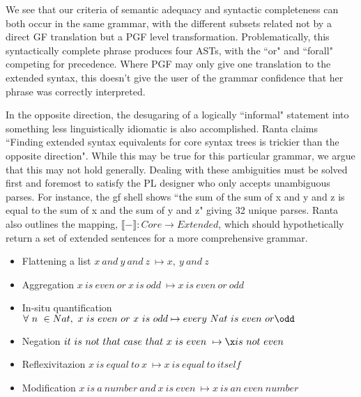 
We see that our criteria of semantic adequacy and syntactic completeness can
both occur in the same grammar, with the different subsets related not by a
direct GF translation but a PGF level transformation. Problematically, this
syntactically complete phrase produces four ASTs, with the ``or" and ``forall"
competing for precedence. Where PGF may only give one translation to the
extended syntax, this doesn't give the user of the grammar confidence that her
phrase was correctly interpreted.

In the opposite direction, the desugaring of a logically ``informal"
statement into something less linguistically idiomatic is also accomplished.
Ranta claims ``Finding extended syntax equivalents for core syntax trees is
trickier than the opposite direction". While this may be true for this
particular grammar, we argue that this may not hold generally. Dealing with these ambiguities must be
solved first and foremost to satisfy the PL designer who only accepts
unambiguous parses. For instance, the gf shell shows ``the sum of the
sum of x and y and z is equal to the sum of x and the sum of y and z" giving 32
unique parses. Ranta also outlines the mapping, $\llbracket -
\rrbracket : Core \to Extended$, which should hypothetically return a set of extended
sentences for a more comprehensive grammar.

\begin{itemize}
\item Flattening a list
  $x\ and\ y\ and\ z\ \mapsto x,\ y\ and\ z$
\item Aggregation
  $x\ is\ even\ or\ x\ is\ odd\ \mapsto x\ is\ even\ or\ odd$
\item In-situ quantification \\
  $\forall\ n\ \in Nat,\ x\ is\ even\ or\ x\ is\ odd \mapsto every\ Nat\ is\ even\ or \odd$
\item Negation
  $it\ is\ not\ that\ case\ that\ x\ is\ even\ \mapsto \x is\ not\ even$
\item Reflexivitazion
  $x\ is\ equal\ to\ x\ \mapsto x\ is\ equal\ to\ itself$
\item Modification
  $x\ is\ a\ number\ and\ x\ is\ even\ \mapsto x\ is\ an\ even\ number$
\end{itemize}

